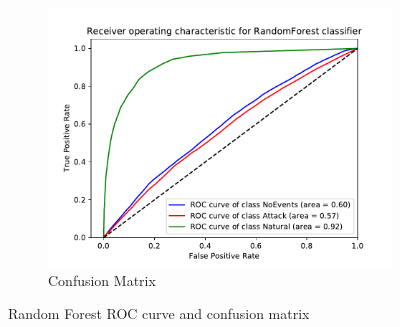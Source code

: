 \begin{figure}[H]
\begin{subfigure}[t]{0.3\textwidth}
        \includegraphics[page=2, width=\linewidth, trim= 0 50 0 100, clip]{images/results_scikit/RandomForest}
        \caption{Confusion Matrix}
        \label{fig:scikit_RF_CM}
    \end{subfigure}
    \caption{Random Forest ROC curve and confusion matrix}
    \label{fig:ROCCM_RF}
\end{figure}


